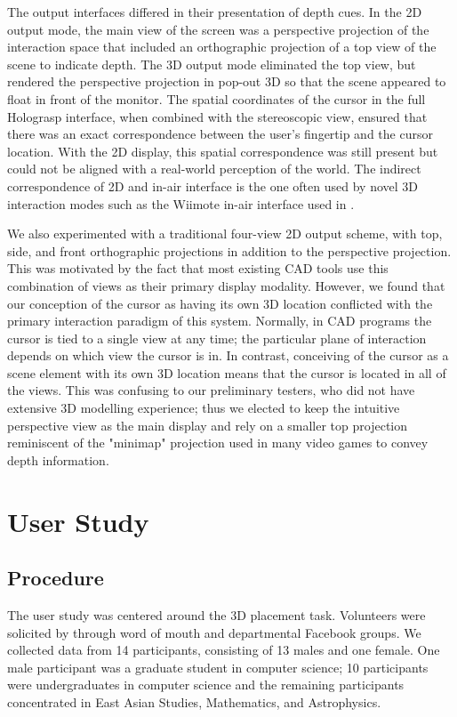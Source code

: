 \documentclass[pageno]{jpaper}
\begin{document}
The output interfaces differed in their presentation of depth cues. In the 2D output mode,
the main view of the screen was a perspective projection of the interaction space that
included an orthographic projection of a top view of the scene to indicate depth. The 3D output mode eliminated the top
view, but rendered the perspective projection in pop-out 3D so that the scene appeared to
float in front of the monitor. The spatial coordinates of the cursor in the full Holograsp interface, when combined
with the stereoscopic view, ensured that there was an exact correspondence between the user's fingertip
and the cursor location. With the 2D display, this spatial correspondence was still present but could not
be aligned with a real-world perception of the world. The indirect correspondence of 2D and in-air interface is the one
often used by novel 3D interaction modes such as the Wiimote in-air interface used in \cite{study1}.

We also experimented with a traditional four-view 2D output
scheme, with top, side, and front orthographic projections in addition to the perspective projection.
This was motivated by the fact that most existing CAD tools use this combination of views as their
primary display modality. However, we found that our conception of the cursor as having its own
3D location conflicted with the primary interaction paradigm of this system. Normally, in CAD programs
the cursor is tied to a single view at any time; the particular plane of interaction depends on which view
the cursor is in. In contrast, conceiving of the cursor as a scene element with its own 3D location means
that the cursor is located in all of the views. This was confusing to our preliminary testers, who did not
have extensive 3D modelling experience; thus we elected to keep the intuitive perspective view as the
main display and rely on a smaller top projection reminiscent of the "minimap" projection used in many
video games to convey depth information.

\section{User Study}
\subsection{Procedure}
The user study was centered around the 3D placement task. Volunteers were solicited by
through word of mouth and departmental Facebook groups. We collected data from 14 participants,
consisting of 13 males and one female. One male participant was a graduate student in computer
science; 10 participants were undergraduates in computer science and the remaining participants
concentrated in East Asian Studies, Mathematics, and Astrophysics.
\end{document}
